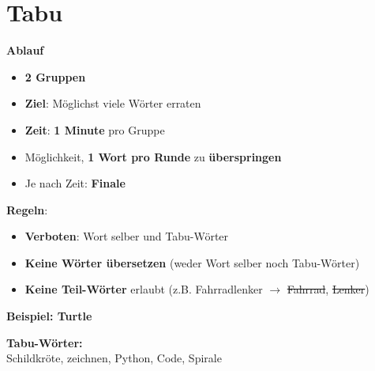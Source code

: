 \geometry{paperwidth=22cm, paperheight=8cm, margin=0.5cm}



\pagestyle{empty}

\huge
\newcommand{\tabucard}[2]{
    \begin{tcolorbox}[
        colback=white,
        colframe=RoyalBlue,
        boxrule=2pt,
        arc=0pt,
        height=\textheight,
        width=\textwidth,
        valign=center,
        halign=center,
        nobeforeafter
    ]
        \vspace*{\fill}
        \begin{center}
            \textbf{\Huge #1}
            
            \vspace{1.5cm}
            
            \begin{tcolorbox}[
                colback=RoyalBlue!10,
                colframe=RoyalBlue,
                boxrule=1.5pt,
                arc=4pt,
                width=0.85\textwidth,
                nobeforeafter
            ]
                \textbf{\Large Tabu-Wörter:} \\[0.5cm]
                \Large #2
            \end{tcolorbox}
        \end{center}
        \vspace*{\fill}
    \end{tcolorbox}
    \newpage
}


\section*{\Huge Tabu}
\textbf{Ablauf}
\begin{itemize}
\item \textbf{2 Gruppen}
\item \textbf{Ziel}: Möglichst viele Wörter erraten
\item {} \textbf{Zeit}: \textbf{1 Minute} pro Gruppe 
\item Möglichkeit, \textbf{1 Wort pro Runde} zu \textbf{überspringen}
\item Je nach Zeit: \textbf{Finale} 
\end{itemize}

\textbf{Regeln}:
\begin{itemize}
\item \textbf{Verboten}: Wort selber und Tabu-Wörter
\item \textbf{Keine Wörter übersetzen} (weder Wort selber noch Tabu-Wörter)
\item \textbf{Keine Teil-Wörter} erlaubt (z.B. Fahrradlenker $\rightarrow$ \sout{Fahrrad}, \sout{Lenker})
\end{itemize}

\newpage
\restoregeometry

\tabucard{Beispiel: Turtle}{
Schildkröte, zeichnen, Python, Code, Spirale
}

